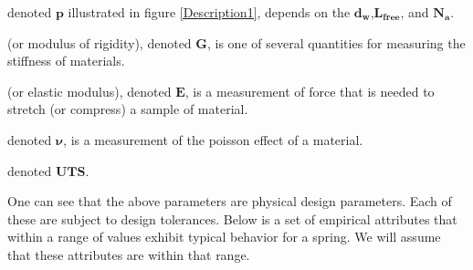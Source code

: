 \documentclass[10pt]{article}
\begin{document}
\begin{description}[leftmargin=!,labelwidth=\widthof{\bfseries Ultimate torsional stress:}]
			\item[Pitch] denoted $\mathbf{p}$ illustrated in figure \ref{Description1}, depends on the $\mathbf{d_{w}}$,$\mathbf{L_{free}}$, and $\mathbf{N_{a}}$.			
			
			\item[Shear Modulus] (or modulus of rigidity), denoted $\mathbf{G}$, is one of several quantities for measuring the stiffness of materials.
			
			\item[Young's Modulus] (or elastic modulus), denoted $\mathbf{E}$, is a measurement of force that is needed  to stretch (or compress) a sample of material.
			
			\item[Poisson Ratio] denoted $\mathbf{\nu}$, is a measurement of the poisson effect of a material. 
			
			\item[Ultimate Torsional Stress] denoted $\mathbf{UTS}$. 
		
		\end{description}

One can see that the above parameters are physical design parameters. Each of these are subject to design tolerances. Below is a set of empirical attributes that within a range of values exhibit typical behavior for a spring. We will assume that these attributes are within that range. 
\end{document}
